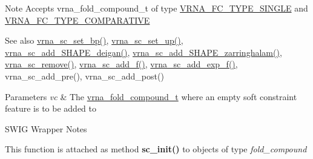 \begin{DoxyNote}{Note}
Accepts vrna\+\_\+fold\+\_\+compound\+\_\+t of type \hyperlink{group__fold__compound_gga01a4ff86fa71deaaa5d1abbd95a1447da7e264dd3cf2dc9b6448caabcb7763cd6}{V\+R\+N\+A\+\_\+\+F\+C\+\_\+\+T\+Y\+P\+E\+\_\+\+S\+I\+N\+G\+LE} and \hyperlink{group__fold__compound_gga01a4ff86fa71deaaa5d1abbd95a1447dab821ce46ea3cf665be97df22a76f5023}{V\+R\+N\+A\+\_\+\+F\+C\+\_\+\+T\+Y\+P\+E\+\_\+\+C\+O\+M\+P\+A\+R\+A\+T\+I\+VE}
\end{DoxyNote}
\begin{DoxySeeAlso}{See also}
\hyperlink{group__soft__constraints_ga8e4334b24bc91453fbcda490a4e331af}{vrna\+\_\+sc\+\_\+set\+\_\+bp()}, \hyperlink{group__soft__constraints_ga99ed63f3ef9e7fe3997932030487a344}{vrna\+\_\+sc\+\_\+set\+\_\+up()}, \hyperlink{group__SHAPE__reactivities_ga57d612b58e1c61dd6cfcb5a843f8f1b3}{vrna\+\_\+sc\+\_\+add\+\_\+\+S\+H\+A\+P\+E\+\_\+deigan()}, \hyperlink{group__SHAPE__reactivities_gaf3c65a045060aef5c4e41693d30af58c}{vrna\+\_\+sc\+\_\+add\+\_\+\+S\+H\+A\+P\+E\+\_\+zarringhalam()}, \hyperlink{group__soft__constraints_ga73cdc07b9a199c614367bebef0f2c41a}{vrna\+\_\+sc\+\_\+remove()}, \hyperlink{group__soft__constraints_ga8c7d907ec0125cd61c04e0908010a4e9}{vrna\+\_\+sc\+\_\+add\+\_\+f()}, \hyperlink{group__soft__constraints_ga87e382b5d0c9b7d9ce1b79c0473ff700}{vrna\+\_\+sc\+\_\+add\+\_\+exp\+\_\+f()}, vrna\+\_\+sc\+\_\+add\+\_\+pre(), vrna\+\_\+sc\+\_\+add\+\_\+post() 
\end{DoxySeeAlso}

\begin{DoxyParams}{Parameters}
{\em vc} & The \hyperlink{group__fold__compound_ga1b0cef17fd40466cef5968eaeeff6166}{vrna\+\_\+fold\+\_\+compound\+\_\+t} where an empty soft constraint feature is to be added to\\
\hline
\end{DoxyParams}
\begin{DoxyRefDesc}{S\+W\+I\+G Wrapper Notes}
\item[\hyperlink{wrappers__wrappers000013}{S\+W\+I\+G Wrapper Notes}]This function is attached as method {\bfseries sc\+\_\+init()} to objects of type {\itshape fold\+\_\+compound} \end{DoxyRefDesc}
